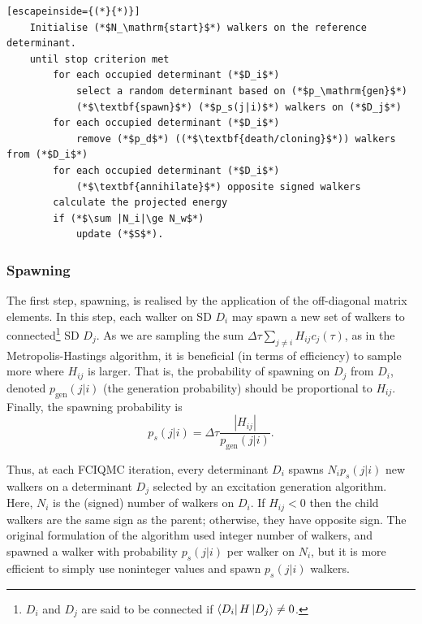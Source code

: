 \begin{minipage}{\textwidth}
\begin{lstlisting}[escapeinside={(*}{*)}]
    Initialise (*$N_\mathrm{start}$*) walkers on the reference determinant.
    until stop criterion met
        for each occupied determinant (*$D_i$*)
            select a random determinant based on (*$p_\mathrm{gen}$*)
            (*$\textbf{spawn}$*) (*$p_s(j|i)$*) walkers on (*$D_j$*)
        for each occupied determinant (*$D_i$*)
            remove (*$p_d$*) ((*$\textbf{death/cloning}$*)) walkers from (*$D_i$*)
        for each occupied determinant (*$D_i$*)
            (*$\textbf{annihilate}$*) opposite signed walkers
        calculate the projected energy
        if (*$\sum |N_i|\ge N_w$*)
            update (*$S$*).
\end{lstlisting}
\end{minipage}

\subsubsection{Spawning}

The first step, spawning, is realised by the application of the off-diagonal matrix elements. In this step, each walker on \gls{SD} $D_i$ may spawn a new set of walkers to connected\footnote{$D_i$ and $D_j$ are said to be connected if $\bra{D_i}H\ket{D_j}\neq 0$.} \gls{SD} $D_j$. As we are sampling the sum $\Delta\tau\sum_{j\neq i} H_{ij}c_j(\tau)$, as in the Metropolis-Hastings algorithm, it is beneficial (in terms of efficiency) to sample more where $H_{ij}$ is larger. That is, the probability of spawning on $D_j$ from $D_i$, denoted $p_\mathrm{gen}(j|i)$ (the generation probability) should be proportional to $H_{ij}$. Finally, the spawning probability is
\begin{equation}
    p_s(j|i) = \Delta\tau\frac{|H_{ij}|}{p_\mathrm{gen}(j|i)}.
\end{equation}

Thus, at each FCIQMC iteration, every determinant $D_i$ spawns $N_ip_s(j|i)$ new walkers on a determinant $D_j$ selected by an excitation generation algorithm.\supercite{neufeldExciting2019,liFast2018,weserExploiting2023}
Here, $N_i$ is the (signed) number of walkers on $D_i$. If $H_{ij} < 0$ then the child walkers are the same sign as the parent; otherwise, they have opposite sign. The original formulation of the algorithm used integer number of walkers, and spawned a walker with probability $p_s(j|i)$ per walker on $N_i$, but it is more efficient to simply use noninteger values and spawn $p_s(j|i)$ walkers.

